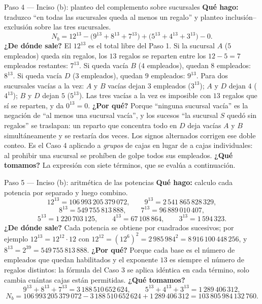 \documentclass[11pt]{article}
\begin{document}
\begin{paso}{Paso 4 --- Inciso (b): planteo del complemento sobre sucursales}
\textbf{Qué hago:} traduzco ``en todas las sucursales queda al menos un regalo'' y planteo inclusión--exclusión sobre las tres sucursales.
\[
N_b=12^{13}-\bigl(9^{13}+8^{13}+7^{13}\bigr)+\bigl(5^{13}+4^{13}+3^{13}\bigr)-0 .
\]
\textbf{¿De dónde sale?} El $12^{13}$ es el total libre del Paso 1. Si la sucursal $A$ ($5$ empleados) queda sin regalos, los $13$ regalos se reparten entre los $12-5=7$ empleados restantes: $7^{13}$. Si queda vacía $B$ ($4$ empleados), quedan $8$ empleados: $8^{13}$. Si queda vacía $D$ ($3$ empleados), quedan $9$ empleados: $9^{13}$. Para dos sucursales vacías a la vez: $A$ y $B$ vacías dejan $3$ empleados ($3^{13}$); $A$ y $D$ dejan $4$ ($4^{13}$); $B$ y $D$ dejan $5$ ($5^{13}$). Las tres vacías a la vez es imposible con $13$ regalos que sí se reparten, y da $0^{13}=0$.
\textbf{¿Por qué?} Porque ``ninguna sucursal vacía'' es la negación de ``al menos una sucursal vacía'', y los sucesos ``la sucursal $S$ quedó sin regalos'' se traslapan: un reparto que concentra todo en $D$ deja vacías $A$ y $B$ simultáneamente y se restaría dos veces. Los signos alternados corrigen ese doble conteo. Es el Caso 4 aplicado a \emph{grupos} de cajas en lugar de a cajas individuales: al prohibir una sucursal se prohíben de golpe todos sus empleados.
\textbf{¿Qué tomamos?} La expresión con siete términos, que se evalúa a continuación.
\end{paso}

\begin{paso}{Paso 5 --- Inciso (b): aritmética de las potencias}
\textbf{Qué hago:} calculo cada potencia por separado y luego combino.
\[
12^{13}=106\,993\,205\,379\,072,\qquad 9^{13}=2\,541\,865\,828\,329,
\]
\[
8^{13}=549\,755\,813\,888,\qquad 7^{13}=96\,889\,010\,407,
\]
\[
5^{13}=1\,220\,703\,125,\qquad 4^{13}=67\,108\,864,\qquad 3^{13}=1\,594\,323 .
\]
\textbf{¿De dónde sale?} Cada potencia se obtiene por cuadrados sucesivos; por ejemplo $12^{13}=12^{12}\cdot 12$ con $12^{12}=(12^6)^2=2\,985\,984^2=8\,916\,100\,448\,256$, y $8^{13}=2^{39}=549\,755\,813\,888$.
\textbf{¿Por qué?} Porque cada base es el número de empleados que quedan habilitados y el exponente $13$ es siempre el número de regalos distintos: la fórmula del Caso 3 se aplica idéntica en cada término, solo cambia cuántas cajas están permitidas.
\textbf{¿Qué tomamos?}
\[
9^{13}+8^{13}+7^{13}=3\,188\,510\,652\,624,\qquad 5^{13}+4^{13}+3^{13}=1\,289\,406\,312 ,
\]
\[
N_b=106\,993\,205\,379\,072-3\,188\,510\,652\,624+1\,289\,406\,312=103\,805\,984\,132\,760 .
\]
\end{paso}
\end{document}
